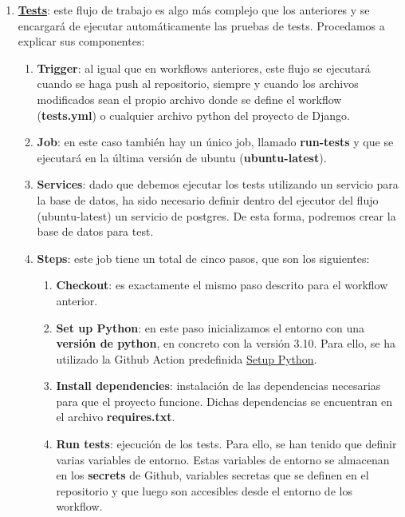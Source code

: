 \begin{enumerate}
        \item \textbf{\href{https://github.com/alexespana/TFG/actions/workflows/tests.yml}
        {Tests}}: este flujo de trabajo es algo más complejo que los anteriores y se encargará
        de ejecutar automáticamente las pruebas de tests. Procedamos a explicar sus componentes:
            \begin{enumerate}
                \item \textbf{Trigger}: al igual que en workflows anteriores, este flujo se
                ejecutará cuando se haga push al repositorio, siempre y cuando los archivos
                modificados sean el propio archivo donde se define el workflow
                (\textbf{tests.yml}) o cualquier archivo python del proyecto de Django.
                \item \textbf{Job}: en este caso también hay un único job, llamado
                \textbf{run-tests} y que se ejecutará en la última versión de ubuntu
                (\textbf{ubuntu-latest}).
                \item \textbf{Services}: dado que debemos ejecutar los tests utilizando un
                servicio para la base de datos, ha sido necesario definir dentro del ejecutor
                del flujo (ubuntu-latest) un servicio de postgres. De esta forma,
                podremos crear la base de datos para test.              
                \item \textbf{Steps}: este job tiene un total de cinco pasos, que son los
                siguientes:
                    \begin{enumerate}
                        \item \textbf{Checkout}: es exactamente el mismo paso descrito para
                        el workflow anterior.
                        \item \textbf{Set up Python}: en este paso inicializamos el entorno
                        con una \textbf{versión de python}, en concreto con la versión 3.10.
                        Para ello, se ha utilizado la Github Action predefinida
                        \href{https://github.com/marketplace/actions/setup-python}{Setup
                        Python}.
                        \item \textbf{Install dependencies}: instalación de las dependencias
                        necesarias para que el proyecto funcione. Dichas dependencias se
                        encuentran en el archivo \textbf{requires.txt}.
                        \item \textbf{Run tests}: ejecución de los tests. Para ello, se han
                        tenido que definir varias variables de entorno. Estas variables de
                        entorno se almacenan en los \textbf{secrets} de Github, variables
                        secretas que se definen en el repositorio y que luego son accesibles
                        desde el entorno de los workflow.\\
                        

\end{enumerate}
\end{enumerate}
\end{enumerate}
